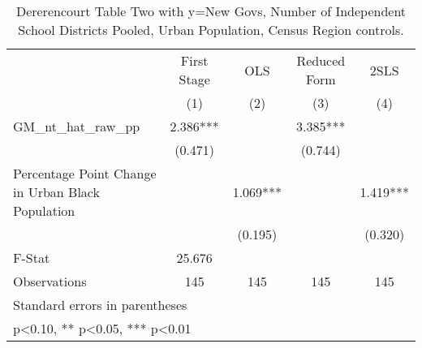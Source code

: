 \begin{table}[htbp]\centering
\def\sym#1{\ifmmode^{#1}\else\(^{#1}\)\fi}
\caption{Dererencourt Table Two with y=New Govs, Number of Independent School Districts Pooled, Urban Population, Census Region controls.}
\begin{tabular}{l*{4}{c}}
\toprule
                    & First Stage   &         OLS   &Reduced Form   &        2SLS   \\
                    &\multicolumn{1}{c}{(1)}   &\multicolumn{1}{c}{(2)}   &\multicolumn{1}{c}{(3)}   &\multicolumn{1}{c}{(4)}   \\
\midrule
GM\_nt\_hat\_raw\_pp    &       2.386***&               &       3.385***&               \\
                    &     (0.471)   &               &     (0.744)   &               \\
\addlinespace
Percentage Point Change in Urban Black Population&               &       1.069***&               &       1.419***\\
                    &               &     (0.195)   &               &     (0.320)   \\
\midrule
F-Stat              &      25.676   &               &               &               \\
Observations        &         145   &         145   &         145   &         145   \\
\bottomrule
\multicolumn{5}{l}{\footnotesize Standard errors in parentheses}\\
\multicolumn{5}{l}{\footnotesize * p<0.10, ** p<0.05, *** p<0.01}\\
\end{tabular}
\end{table}
